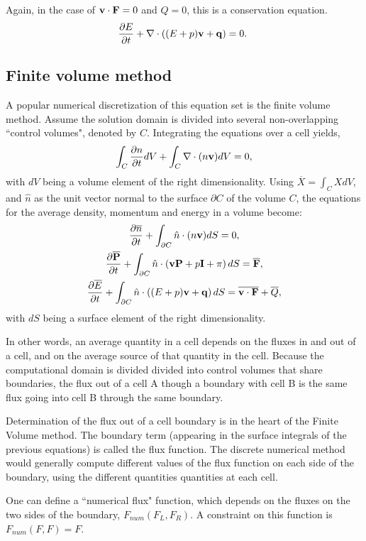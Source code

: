 Again, in the case of $\mathbf{v}\cdot\mathbf{F} = 0$ and $Q=0$, this is a conservation equation. 
\begin{gather}
    \frac{\partial E}{\partial t} + \nabla \cdot\left((E + p)\mathbf{v} +\mathbf{q}\right) =  0.~\label{eq:energy_conservation}
\end{gather}

\subsection{Finite volume method}

A popular numerical discretization of this equation set is the finite volume method. Assume the solution domain is divided into several non-overlapping ``control volumes", denoted by $C$. Integrating the equations over a cell yields,
\begin{gather}
	\int_C\frac{\partial n}{\partial t}dV + \int_C \nabla \cdot (n \mathbf{v})dV = 0,
\end{gather}
with $dV$ being a volume element of the right dimensionality. Using $\overline X = \int_C X dV$, and $\hat n$ as the unit vector normal to the surface $\partial C$ of the volume $C$, the equations for the average density, momentum and energy in a volume become:
\begin{gather}
	\frac{\partial \overline n}{\partial t} + \int_{\partial C} \hat n \cdot (n \mathbf{v})dS = 0,\\
    	\frac{\partial \overline {\mathbf{P}}}{\partial t} + \int_{\partial C} \hat n  \cdot\left(\mathbf{v} \mathbf{P} + p \mathbf{I} + \pi\right)dS = \overline {\mathbf{F}},\\
    	\frac{\partial \overline E}{\partial t} +  \int_{\partial C} \hat n \cdot \left( (E + p)\mathbf{v}+\mathbf{q}\right)dS =  \overline{\mathbf{v}\cdot\mathbf{F}}+ \overline Q,
\end{gather}
with $dS$ being a surface element of the right dimensionality.

In other words, an average quantity in a cell depends on the fluxes in and out of a cell, and on the average source of that quantity in the cell. Because the computational domain is divided divided into control volumes that share boundaries, the flux out of a cell A though a boundary with cell B is the same flux going into cell B through the same boundary.

Determination of the flux out of a cell boundary is in the heart of the Finite Volume method. The boundary term (appearing in the surface integrals of the previous equations) is called the flux function. The discrete numerical method would generally compute different values of the flux function on each side of the boundary, using the different quantities quantities at each cell.

One can define a ``numerical flux" function, which depends on the fluxes on the two sides of the boundary, $F_{num}(F_L, F_R)$. A constraint on this function is $F_{num}(F, F) = F$. 
























